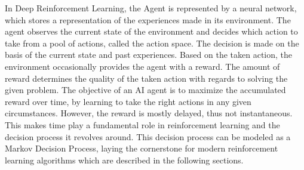 \documentclass[12pt,a4paper]{article}
\begin{document}
In Deep Reinforcement Learning, the Agent is represented by a neural network, which stores a representation of the experiences made in its environment. The agent observes the current state of the environment and decides which action to take from a pool of actions, called the action space.
The decision is made on the basis of the current state and past experiences. Based on the taken action, the environment occasionally provides the agent with a reward. The amount of reward determines the quality of the taken action with regards to solving the given problem.
The objective of an AI agent is to maximize the accumulated reward over time, by learning to take the right actions in any given circumstances.
However, the reward is mostly delayed, thus not instantaneous. This makes time play a fundamental role in reinforcement learning and the decision process it revolves around.
This decision process can be modeled as a Markov Decision Process, laying the cornerstone for modern reinforcement learning algorithms which are described in the following sections.
\end{document}
